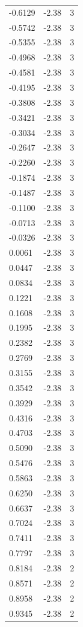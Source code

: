 \begin{longtable}{lrr}
  -0.6129 & -2.38 & 3 \\
  -0.5742 & -2.38 & 3 \\
  -0.5355 & -2.38 & 3 \\
  -0.4968 & -2.38 & 3 \\
  -0.4581 & -2.38 & 3 \\
  -0.4195 & -2.38 & 3 \\
  -0.3808 & -2.38 & 3 \\
  -0.3421 & -2.38 & 3 \\
  -0.3034 & -2.38 & 3 \\
  -0.2647 & -2.38 & 3 \\
  -0.2260 & -2.38 & 3 \\
  -0.1874 & -2.38 & 3 \\
  -0.1487 & -2.38 & 3 \\
  -0.1100 & -2.38 & 3 \\
  -0.0713 & -2.38 & 3 \\
  -0.0326 & -2.38 & 3 \\
  0.0061 & -2.38 & 3 \\
  0.0447 & -2.38 & 3 \\
  0.0834 & -2.38 & 3 \\
  0.1221 & -2.38 & 3 \\
  0.1608 & -2.38 & 3 \\
  0.1995 & -2.38 & 3 \\
  0.2382 & -2.38 & 3 \\
  0.2769 & -2.38 & 3 \\
  0.3155 & -2.38 & 3 \\
  0.3542 & -2.38 & 3 \\
  0.3929 & -2.38 & 3 \\
  0.4316 & -2.38 & 3 \\
  0.4703 & -2.38 & 3 \\
  0.5090 & -2.38 & 3 \\
  0.5476 & -2.38 & 3 \\
  0.5863 & -2.38 & 3 \\
  0.6250 & -2.38 & 3 \\
  0.6637 & -2.38 & 3 \\
  0.7024 & -2.38 & 3 \\
  0.7411 & -2.38 & 3 \\
  0.7797 & -2.38 & 3 \\
  0.8184 & -2.38 & 2 \\
  0.8571 & -2.38 & 2 \\
  0.8958 & -2.38 & 2 \\
  0.9345 & -2.38 & 2 \\

\end{longtable}
